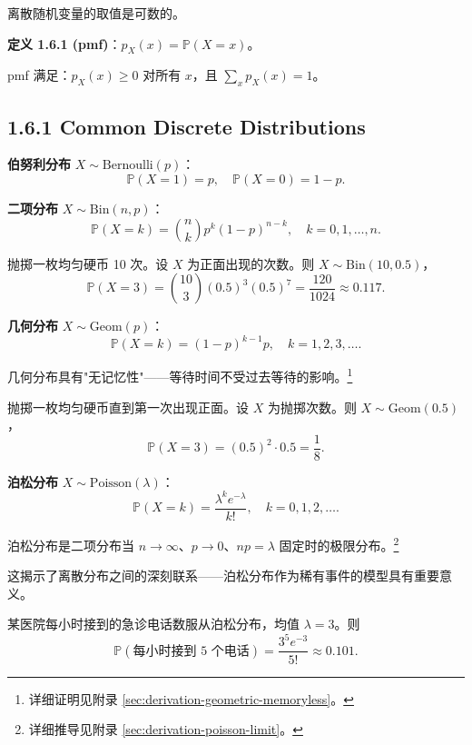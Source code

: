 离散随机变量的取值是可数的。

\begin{remark}
\textbf{定义 1.6.1 (pmf)}：$p_X(x) = \mathbb{P}(X = x)$。

pmf 满足：$p_X(x) \geq 0$ 对所有 $x$，且 $\sum_x p_X(x) = 1$。
\end{remark}

\subsection{1.6.1 Common Discrete Distributions}

\textbf{伯努利分布} $X \sim \text{Bernoulli}(p)$：
\[
\mathbb{P}(X = 1) = p, \quad \mathbb{P}(X = 0) = 1-p.
\tag{1.6.1}\label{eq:bernoulli-ch1}
\]

\textbf{二项分布} $X \sim \text{Bin}(n, p)$：
\[
\mathbb{P}(X = k) = \binom{n}{k} p^k (1-p)^{n-k}, \quad k = 0, 1, \ldots, n.
\tag{1.6.2}\label{eq:binomial-ch1}
\]

\begin{example}[二项分布]\label{ex:binomial-ch1}
抛掷一枚均匀硬币 10 次。设 $X$ 为正面出现的次数。则 $X \sim \text{Bin}(10, 0.5)$，
\[
\mathbb{P}(X = 3) = \binom{10}{3} (0.5)^3 (0.5)^7 = \frac{120}{1024} \approx 0.117.
\]
\end{example}

\textbf{几何分布} $X \sim \text{Geom}(p)$：
\[
\mathbb{P}(X = k) = (1-p)^{k-1} p, \quad k = 1, 2, 3, \ldots.
\tag{1.6.3}\label{eq:geometric-ch1}
\]

几何分布具有"无记忆性"——等待时间不受过去等待的影响。\footnote{详细证明见附录 \cref{sec:derivation-geometric-memoryless}。}

\begin{example}[几何分布]\label{ex:geometric-ch1}
抛掷一枚均匀硬币直到第一次出现正面。设 $X$ 为抛掷次数。则 $X \sim \text{Geom}(0.5)$，
\[
\mathbb{P}(X = 3) = (0.5)^2 \cdot 0.5 = \frac{1}{8}.
\]
\end{example}

\textbf{泊松分布} $X \sim \text{Poisson}(\lambda)$：
\[
\mathbb{P}(X = k) = \frac{\lambda^k e^{-\lambda}}{k!}, \quad k = 0, 1, 2, \ldots.
\tag{1.6.4}\label{eq:poisson-ch1}
\]

泊松分布是二项分布当 $n \to \infty$、$p \to 0$、$np = \lambda$ 固定时的极限分布。\footnote{详细推导见附录 \cref{sec:derivation-poisson-limit}。}

这揭示了离散分布之间的深刻联系——泊松分布作为稀有事件的模型具有重要意义。

\begin{example}[泊松分布]\label{ex:poisson-ch1}
某医院每小时接到的急诊电话数服从泊松分布，均值 $\lambda = 3$。则
\[
\mathbb{P}(\text{每小时接到 5 个电话}) = \frac{3^5 e^{-3}}{5!} \approx 0.101.
\]
\end{example}

